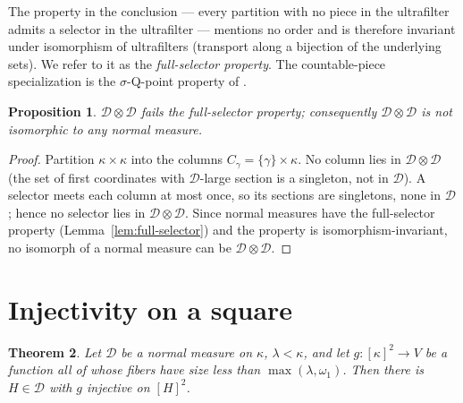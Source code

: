 \documentclass[11pt]{article}
\newtheorem{theorem}{Theorem}[section]
\newtheorem{proposition}[theorem]{Proposition}
\theoremstyle{definition}
\newcommand{\D}{\mathcal{D}}
\begin{document}
The property in the conclusion --- every partition with no piece in the
ultrafilter admits a selector in the ultrafilter --- mentions no order and
is therefore invariant under isomorphism of ultrafilters (transport along a
bijection of the underlying sets). We refer to it as the
\emph{full-selector property}. The countable-piece specialization is the
$\sigma$-Q-point property of \cite{FWIII}.

\begin{proposition}\label{prop:notiso}
$\D\otimes\D$ fails the full-selector property; consequently
$\D\otimes\D$ is not isomorphic to any normal measure.
\end{proposition}

\begin{proof}
Partition $\kappa\times\kappa$ into the columns
$C_\gamma=\{\gamma\}\times\kappa$. No column lies in $\D\otimes\D$ (the set
of first coordinates with $\D$-large section is a singleton, not in $\D$).
A selector meets each column at most once, so its sections are singletons,
none in $\D$; hence no selector lies in $\D\otimes\D$. Since normal
measures have the full-selector property (Lemma~\ref{lem:full-selector})
and the property is isomorphism-invariant, no isomorph of a normal measure
can be $\D\otimes\D$.
\end{proof}

\section{Injectivity on a square}\label{sec:inj}

\begin{theorem}\label{thm:inj}
Let $\D$ be a normal measure on $\kappa$, $\lambda<\kappa$, and let
$g:[\kappa]^2\to V$ be a function all of whose fibers have size less than
$\max(\lambda,\omega_1)$. Then there is $H\in\D$ with $g$ injective on
$[H]^2$.
\end{theorem}
\end{document}
